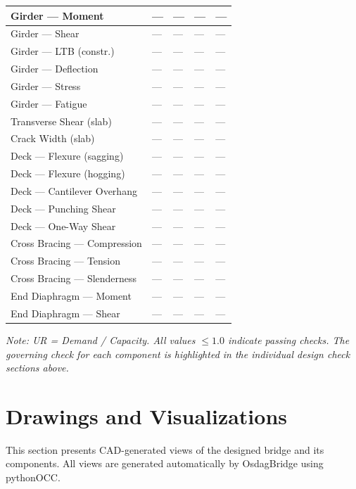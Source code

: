\documentclass[12pt,a4paper]{report}
\numberwithin{table}{chapter}
\numberwithin{figure}{chapter}
\begin{document}
\begin{longtable}{|C{3.4cm}|L{4.5cm}|C{2.3cm}|C{2.3cm}|>{\centering\arraybackslash}p{1.6cm}|}
\endlastfoot
Girder --- Moment & --- & --- & --- & --- \\[6pt]
\hline
Girder --- Shear & --- & --- & --- & --- \\[6pt]
\hline
Girder --- LTB (constr.) & --- & --- & --- & --- \\[6pt]
\hline
Girder --- Deflection & --- & --- & --- & --- \\[6pt]
\hline
Girder --- Stress & --- & --- & --- & --- \\[6pt]
\hline
Girder --- Fatigue & --- & --- & --- & --- \\[6pt]
\hline
Transverse Shear (slab) & --- & --- & --- & --- \\[6pt]
\hline
Crack Width (slab) & --- & --- & --- & --- \\[6pt]
\hline
Deck --- Flexure (sagging) & --- & --- & --- & --- \\[6pt]
\hline
Deck --- Flexure (hogging) & --- & --- & --- & --- \\[6pt]
\hline
Deck --- Cantilever Overhang & --- & --- & --- & --- \\[6pt]
\hline
Deck --- Punching Shear & --- & --- & --- & --- \\[6pt]
\hline
Deck --- One-Way Shear & --- & --- & --- & --- \\[6pt]
\hline
Cross Bracing --- Compression & --- & --- & --- & --- \\[6pt]
\hline
Cross Bracing --- Tension & --- & --- & --- & --- \\[6pt]
\hline
Cross Bracing --- Slenderness & --- & --- & --- & --- \\[6pt]
\hline
End Diaphragm --- Moment & --- & --- & --- & --- \\[6pt]
\hline
End Diaphragm --- Shear & --- & --- & --- & --- \\[6pt]
\hline
\end{longtable}
\noindent\textit{Note: UR = Demand / Capacity. All values $\leq 1.0$ indicate passing checks. The governing check for each component is highlighted in the individual design check sections above.}



\chapter{Drawings and Visualizations}
\label{ch:drawings}

This section presents CAD-generated views of the designed bridge and its components. All views are generated automatically by OsdagBridge using pythonOCC.
\end{document}
